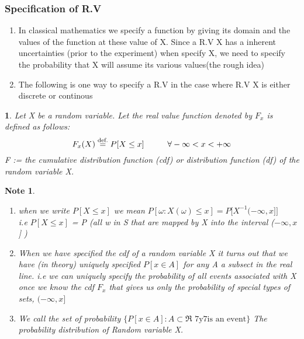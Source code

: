 \documentclass[11pt]{article}
\newtheorem*{note}{Note}
\newtheorem{definition}{\framebox{DEF}}[section]
\newcommand\tab[1][1cm]{\hspace*{#1}}
\begin{document}
        \subsubsection{Specification of R.V}
            \begin{enumerate}
                \item In classical mathematics we specify a function by giving its domain and the values of the function at these value of X.
                        Since a R.V X has a inherent uncertainties (prior to the experiment) when specify X, we need to specify the probability that X will assume its various values(the rough idea)
                \item The following is one way to specify a R.V in the case where R.V X is either discrete or continous
            \end{enumerate}

            \begin{definition}
                Let X be a random variable. Let the real value function denoted by $F_x$ is defined as follows: 
                $$F_x(X) \stackrel{\text{def.}}{=} P[X \leq x] \tab \forall -\infty < x < +\infty$$
                F := the cumulative distribution function (cdf) or distribution function (df) of the random variable X. 
            \end{definition}
            \begin{note}\tab
                \begin{enumerate}
                    \item when we write $P[X \leq x]$ we mean $P[\omega: X(\omega) \leq x] = P\big[X^{-1}(-\infty, x]\big]$ \\
                            i.e $P[X \leq x]$ = P (all w in S that are mapped by X into the interval ($-\infty, x$] )
                    \item When we have specified the cdf of a random variable X it turns out that we have (in theory) uniquely specified $P[x \in A]$ for any A a subsect in the real line. 
                            i.e we can uniquely specify the probability of all events associated with X once we know the cdf $F_x$ that gives us only the probability of special types of sets, $(-\infty,x]$
                    \item We call the set of probability $\big\{P[x \in A]: A \subset \Re \text{ 7y7is an event} \big\}$ The probability distribution of Random variable X.
                \end{enumerate}
            \end{note}
            \newpage
\end{document}
